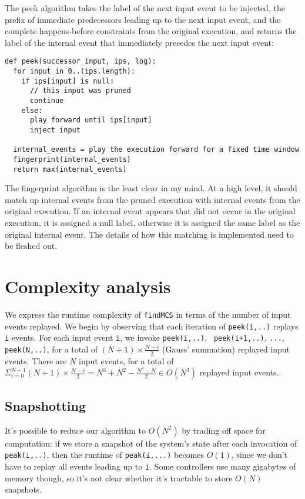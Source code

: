\documentclass[10pt,a4paper,titlepage]{article}
\begin{document}
The peek algorithm takes the label of the next input event to be injected, the prefix of
immediate predecessors leading up to the next input event, and the complete
happens-before constraints from the original execution, and returns the label
of the internal event that immediately precedes the next input event:

\begin{verbatim}
def peek(successor_input, ips, log):
  for input in 0..(ips.length):
    if ips[input] is null:
      // this input was pruned
      continue
    else:
      play forward until ips[input]
      inject input 

  internal_events = play the execution forward for a fixed time window
  fingerprint(internal_events)
  return max(internal_events)
\end{verbatim}

The fingerprint algorithm is the least clear in my mind. At a high level, it
should match up internal events from the pruned execution with internal events
from the original execution. If an internal event appears that did not occur
in the original execution, it is assigned a null label, otherwise it is
assigned the same label as the original internal event. The details of how
this matching is implemented need to be fleshed out.

\section*{Complexity analysis}

We express the runtime complexity of {\tt findMCS} in terms of the number of
input events replayed. We begin by observing that each iteration of {\tt peek(i,..)}
replays {\tt i}
events. For each input event {\tt i}, we invoke {\tt peek(i,..)}, {\tt
peek(i+1,..)}, {\tt ...}, {\tt peek(N,..)}, for a total of $(N+1) \times
\frac{N-i}{2}$
(Gauss' summation) replayed input events. 
There are $N$ input events, for a total of 
$\Sigma_{i=0}^{N-1} (N+1) \times \frac{N-i}{2} = N^3 + N^2 - \frac{N^3 - N}{2}
\in O(N^3)$
replayed input events.

\subsection*{Snapshotting}

It's possible to reduce our algorithm to $O(N^2)$ by trading off space
for computation: if we store a snapshot of the system's state after each
invocation of {\tt peak(i,..)}, then the runtime of {\tt peak(i,...)} becomes
$O(1)$, since we don't have to replay all events leading up to {\tt i}. 
Some controllers use many gigabytes of memory though, so it's not clear
whether it's tractable to store $O(N)$ snapshots.
\end{document}
